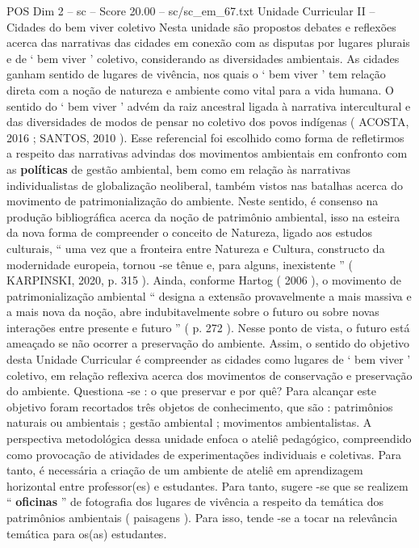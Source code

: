 \begin{textsample}{POS Dim 2 – sc – Score 20.00 – sc/sc\_em\_67.txt}
Unidade Curricular II – Cidades do bem viver coletivo Nesta unidade são propostos debates e reflexões acerca das narrativas das cidades em conexão com as disputas por lugares plurais e de ‘ bem viver ’ coletivo, considerando as diversidades ambientais.
As cidades ganham sentido de lugares de vivência, nos quais o ‘ bem viver ’ tem relação direta com a noção de natureza e ambiente como vital para a vida humana.
O sentido do ‘ bem viver ’ advém da raiz ancestral ligada à narrativa intercultural e das diversidades de modos de pensar no coletivo dos povos indígenas ( ACOSTA, 2016 ; SANTOS, 2010 ).
Esse referencial foi escolhido como forma de refletirmos a respeito das narrativas advindas dos movimentos ambientais em confronto com as \textbf{políticas} de gestão ambiental, bem como em relação às narrativas individualistas de globalização neoliberal, também vistos nas batalhas acerca do movimento de patrimonialização do ambiente.
Neste sentido, é consenso na produção bibliográfica acerca da noção de patrimônio ambiental, isso na esteira da nova forma de compreender o conceito de Natureza, ligado aos estudos culturais, “ uma vez que a fronteira entre Natureza e Cultura, constructo da modernidade europeia, tornou -se tênue e, para alguns, inexistente ” ( KARPINSKI, 2020, p. 315 ).
Ainda, conforme Hartog ( 2006 ), o movimento de patrimonialização ambiental “ designa a extensão provavelmente a mais massiva e a mais nova da noção, abre indubitavelmente sobre o futuro ou sobre novas interações entre presente e futuro ” ( p. 272 ).
Nesse ponto de vista, o futuro está ameaçado se não ocorrer a preservação do ambiente.
Assim, o sentido do objetivo desta Unidade Curricular é compreender as cidades como lugares de ‘ bem viver ’ coletivo, em relação reflexiva acerca dos movimentos de conservação e preservação do ambiente.
Questiona -se : o que preservar e por quê?
Para alcançar este objetivo foram recortados três objetos de conhecimento, que são : patrimônios naturais ou ambientais ; gestão ambiental ; movimentos ambientalistas.
A perspectiva metodológica dessa unidade enfoca o ateliê pedagógico, compreendido como provocação de atividades de experimentações individuais e coletivas.
Para tanto, é necessária a criação de um ambiente de ateliê em aprendizagem horizontal entre professor(es) e estudantes.
Para tanto, sugere -se que se realizem “ \textbf{oficinas} ” de fotografia dos lugares de vivência a respeito da temática dos patrimônios ambientais ( paisagens ).
Para isso, tende -se a tocar na relevância temática para os(as) estudantes.

\end{textsample}
